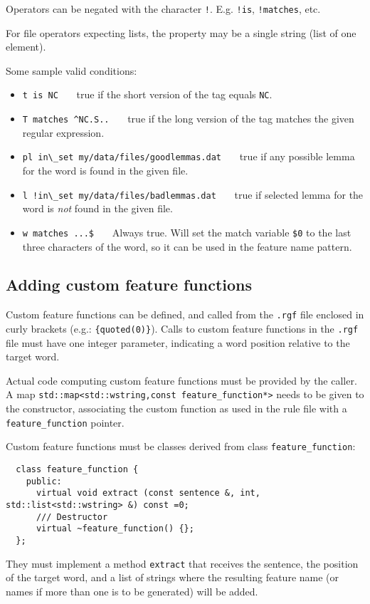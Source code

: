 \documentclass[a4paper]{book}
\begin{document}
   Operators can be negated with the character {\tt !}. 
   E.g. {\tt !is}, {\tt !matches}, etc.

   For file operators expecting lists, the property may be a single string (list of one element).

   Some sample valid conditions:
   \begin{itemize}
     \itemsep 0cm
   \item[] \verb#t is NC#  ~~~true if the short version of the tag equals {\tt NC}.
   \item[] \verb#T matches ^NC.S..#  ~~~true if the long version of the tag matches the given regular expression.
   \item[] \verb#pl in\_set my/data/files/goodlemmas.dat# ~~~true if any possible lemma for the word is found in the given file.
   \item[] \verb#l !in\_set my/data/files/badlemmas.dat# ~~~true if selected lemma for the word is {\sl not} found in the given file.
   \item[] \verb#w matches ...$# ~~~Always true. Will set the match variable {\tt \$0} to the last three characters of the word, so it can be used in the feature name pattern.
   \end{itemize}

  
\subsection{Adding custom feature functions}
\label{s:fex-custom}
  Custom feature functions can be defined, and called from the
  \verb#.rgf# file enclosed in curly brackets (e.g.:
  \verb#{quoted(0)}#).  Calls to custom feature functions in the
  \verb#.rgf# file must have one integer parameter, indicating a
   word position relative to the target word.

  Actual code computing custom feature functions must be provided
  by the caller. A map \verb#std::map<std::wstring,const feature_function*>#
  needs to be given to the constructor, associating the custom function
  as used in the rule file with a \texttt{feature\_function} pointer.

  Custom feature functions must be classes derived from class
  \texttt{feature\_function}:
\begin{verbatim}
  class feature_function {  
    public: 
      virtual void extract (const sentence &, int, std::list<std::wstring> &) const =0;
      /// Destructor
      virtual ~feature_function() {};
  };
\end{verbatim}
 \noindent They must implement a method \texttt{extract} that receives the 
  sentence, the position of the target word, and a list of strings where the 
  resulting feature name (or names if more than one is to be generated) will be
  added.
\end{document}
